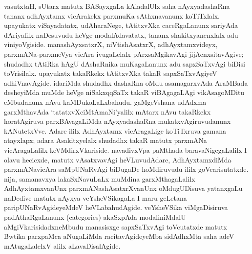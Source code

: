 vasutxtaH, sUtarx matutx BASayxgaLa kAladalUlx saha nAyxyadashaRna tananx \hbox{adhAyxtamx} vicArakekx parxmuKa sAthxnavanunx koTiTxlalx. upayukatx viSayadatatx, udAharaNege, tAtitxvXka caceRgaLanunx sariyAda dAriyalilx naDesuvudu heVge modalAdavatatx, tananx shakitxyanenxlalx adu viniyoVgiside. manashAyxsatxrX, niVtishAsatxrX, adhAyxtamxvideyx, parxmANa-parxmeVya vicAra ivugaLelalx pArxsaMgikavAgi jijAcnxsitavAgive; shudadhx tAtiRka hAgU dAshaRnika muKagaLanunx adu sapxSaTxvAgi biDisi toVrisilalx. upayukatx takaRkekx tAtitxvXka takaR sapxSaTxvAgiyeV adhiVnavAgide. idariMda shudadhx dashaRna oMdu asa\-magarxvAda AraMBada desheyiMda muMde heVge niSakxqqSaTx takaR viBAgagaLAgi vikAsa\-goMDitu eMbudanunx nAvu kaMDukoLaLxbahudu. gaMgeVshana udAdxma garxMthavAda `tatatxvXciMtAmaNi'yalilx mAtarx nAvu takaRkekx horatAgiruva parxBAvagaLiMda nAyxya\-dashaRna mukatxvAgiruvudanunx kANutetxVve. Adare ililx AdhAyxtamx vicAragaLige koTiTx\-ruva gamana atayxlapx; adara Asakitxyelalx shudadhx takaR matutx parxmANa vicAragaLalilx keVMdirxVkariside. navadivxVpa paMthada baravaNigegaLalilx I olavu hecicxde, matutx vAsatxva\-vAgi heVLuvudAdare, AdhAyxtamxdiMda parxmANavicAra saMpUNaRvAgi biDugaDe hoMdiruvudu ililx goVcarisutatxde. nija, samanavxya lakaSxNavuLaLx muMdina garxMtha\-gaLalilx AdhAyxtamxvanUnx parxmANashAsatxrXvanUnx oMdugUDisuva yatanxgaLu naDedive matutx nAyxya veYsheVSikagaLa I maru geLetana paripUNaRvAgideyeMdeV heVLa\-bahu\-dAgide. veYsheVSika viMgaDisiruva padAthaRgaLanunx ({\rm categories}) akaSxpAda modali\-niMdalU aMgiVkarisidadxneMbudu manasisxge sapxSaTxvAgi toVcutatxde matutx Bwtika parxpaMca aNugaLiMda racitavAgideyeMba sidAdhxMta saha adeV mAtugaLalelxV alilx aLavaDisalAgide.

